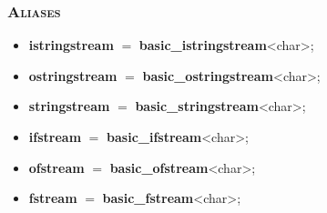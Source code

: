 \documentclass[10pt]{article}
\begin{document}
\begin{multicols*}{5}
{\subsubsection*{\textsc{Aliases}} 
\begin{itemize}[leftmargin=*,topsep=0.25pt]
  \setlength\itemsep{-1.8pt}
	\item \textbf{istringstream} $=$ \textbf{basic\_istringstream}<char>;
	\item \textbf{ostringstream} $=$ \textbf{ba\-sic\_o\-string\-stream}\-<char>;
	\item \textbf{stringstream} $=$ \textbf{basic\_stringstream}<char>;
	\item \textbf{ifstream} $=$ \textbf{basic\_ifstream}<char>;
	\item \textbf{ofstream} $=$ \textbf{basic\_ofstream}<char>;
	\item \textbf{fstream} $=$ \textbf{basic\_fstream}<char>;
\end{itemize}


}
\end{multicols*}
\end{document}
